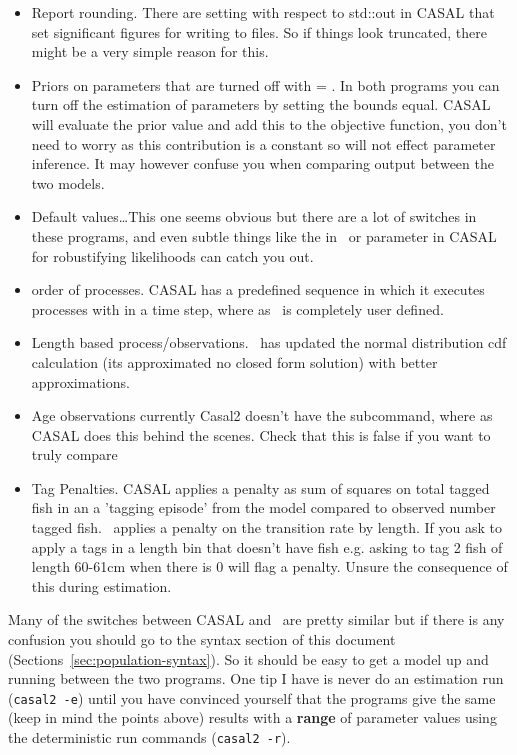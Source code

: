 \begin{itemize}
	\item Report rounding. There are setting with respect to std::out in CASAL that set significant figures for writing to files. So if things look truncated, there might be a very simple reason for this.

	\item Priors on parameters that are turned off with  = . In both programs you can turn off the estimation of parameters by setting the bounds equal. CASAL will evaluate the prior value and add this to the objective function, you don't need to worry as this contribution is a constant so will not effect parameter inference. It may however confuse you when comparing output between the two models.

	\item Default values\dots This one seems obvious but there are a lot of switches in these programs, and even subtle things like the  in \CNAME\ or  parameter in CASAL for robustifying likelihoods can catch you out.

	\item order of processes. CASAL has a predefined sequence in which it executes processes with in a time step, where as \CNAME\ is completely user defined.

	\item Length based process/observations. \CNAME\ has updated the normal distribution cdf calculation (its approximated no closed form solution) with better approximations.

	\item Age observations currently Casal2 doesn't have the  subcommand, where as CASAL does this behind the scenes. Check that this is false if you want to truly compare

	\item Tag Penalties. CASAL applies a penalty as sum of squares on total tagged fish in an a 'tagging episode' from the model compared to observed number tagged fish. \CNAME\ applies a penalty on the transition rate by length. If you ask to apply a tags in a length bin that doesn't have fish e.g. asking to tag 2 fish of length 60-61cm when there is 0 will flag a penalty. Unsure the consequence of this during estimation.
\end{itemize}


Many of the switches between CASAL and \CNAME\ are pretty similar but if there is any confusion you should go to the syntax section of this document (Sections~\ref{sec:population-syntax}). So it should be easy to get a model up and running between the two programs. One tip I have is never do an estimation run (\texttt{casal2 -e}) until you have convinced yourself that the programs give the same (keep in mind the points above) results with a \textbf{range} of parameter values using the deterministic run commands (\texttt{casal2 -r}).


